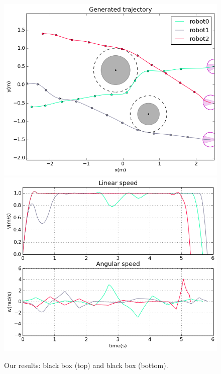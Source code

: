 \documentclass[eprint]{actapoly}
\begin{document}
\begin{figure}\centering
  \includegraphics[width=\linewidth]{./images/no_collision/multirobot-path.png} %
  \\[1mm]
  \includegraphics[width=\linewidth]{./images/no_collision/multirobot-vw.png} %
  \caption{Our results: black box (top) and black box (bottom).\label{fig:nocollision}}
\label{fig:res}
\end{figure}
\end{document}
